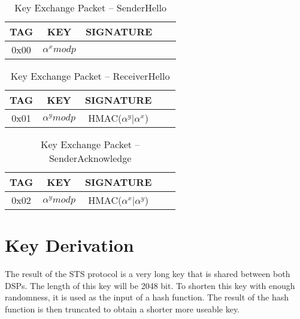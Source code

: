 \documentclass[a4paper]{article}
\begin{document}
\begin{table}[H]
    \begin{center}
        \begin{tabular}{| c | c | c | c | c |}
            \hline
            TAG & KEY & SIGNATURE \\ \hline
            0x00 & $\alpha^x mod p$ & \\
            \hline
        \end{tabular}
    \end{center}
    
    \caption{Key Exchange Packet -- SenderHello}
    \label{tab:key_exchange_packet_senderhello}
\end{table}
\begin{table}[H]
    \begin{center}
        \begin{tabular}{| c | c | c | c | c |}
            \hline
            TAG & KEY & SIGNATURE \\ \hline
            0x01 & $\alpha^y mod p$ & HMAC($\alpha^y \big| \alpha^x$)\\
            \hline
        \end{tabular}
    \end{center}
    
    \caption{Key Exchange Packet -- ReceiverHello}
    \label{tab:key_exchange_packet_receiverhello}
\end{table}
\begin{table}[H]
    \begin{center}
        \begin{tabular}{| c | c | c | c | c |}
            \hline
            TAG & KEY & SIGNATURE \\ \hline
            0x02 & $\alpha^y mod p$ & HMAC($\alpha^x \big| \alpha^y$)\\
            \hline
        \end{tabular}
    \end{center}
    
    \caption{Key Exchange Packet -- SenderAcknowledge}
    \label{tab:key_exchange_packet_senderacknowledge}
\end{table}

\section{Key Derivation}

The result of the STS protocol is a very long key that is shared between both DSPs. The length of this key will be 2048 bit. To shorten this key with enough randomness, it is used as the input of a hash function. The result of the hash function is then truncated to obtain a shorter more useable key.\\
\end{document}
